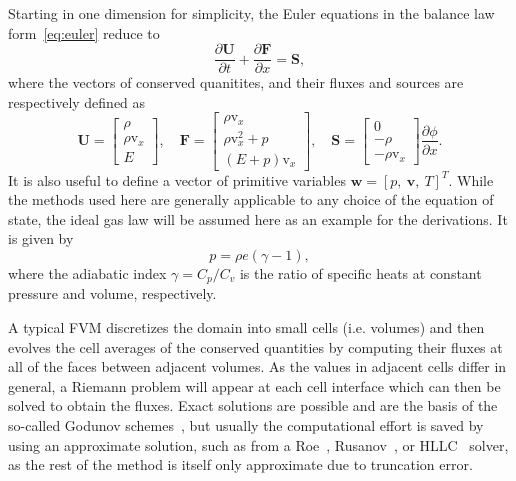 Starting in one dimension for simplicity, the Euler equations in the balance law form~\eqref{eq:euler} reduce to
\begin{equation}
\frac{\partial \mathbf{U}}{\partial t}+\frac{\partial \mathbf{F}}{\partial x}=\mathbf{S},
\end{equation}
where the vectors of conserved quanitites, and their fluxes and sources are respectively defined as
\begin{equation}
\mathbf{U}=
\begin{bmatrix}
\rho \\ \rho \mathrm{v}_x \\ E
\end{bmatrix}
,\quad \mathbf{F}=
\begin{bmatrix}
\rho \mathrm{v}_x \\ \rho \mathrm{v}_x^2+p \\ (E+p)\mathrm{v}_x
\end{bmatrix}
,\quad \mathbf{S}=
\begin{bmatrix}
0 \\ -\rho \\ -\rho \mathrm{v}_x
\end{bmatrix} \frac{\partial \phi}{\partial x}.
\end{equation}
It is also useful to define a vector of primitive variables $\mathbf{w}=[p,\ \mathbf{v},\ T]^T$. While the methods used here are generally applicable to any choice of the equation of state, the ideal gas law will be assumed here as an example for the derivations. It is given by
\begin{equation}
p=\rho e(\gamma-1),
\end{equation}
where the adiabatic index $\gamma=C_p/C_v$ is the ratio of specific heats at constant pressure and volume, respectively.

A typical FVM discretizes the domain into small cells (i.e. volumes) and then evolves the cell averages of the conserved quantities by computing their fluxes at all of the faces between adjacent volumes. As the values in adjacent cells differ in general, a Riemann problem will appear at each cell interface which can then be solved to obtain the fluxes. Exact solutions are possible and are the basis of the so-called Godunov schemes~\cite{Godunov1959}, but usually the computational effort is saved by using an approximate solution, such as from a Roe~\cite{Roe1981}, Rusanov~\cite{Rusanov1961}, or HLLC~\cite{Toro1994} solver, as the rest of the method is itself only approximate due to truncation error.

